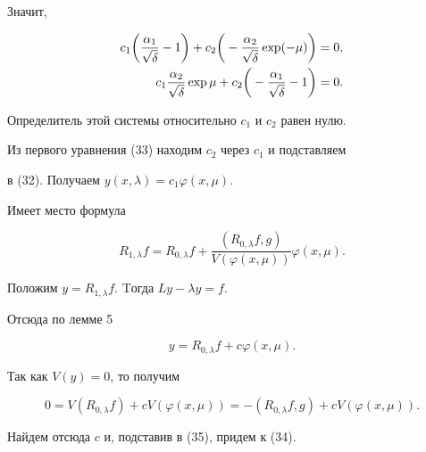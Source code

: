 \begin{pf}
Значит,


\begin{equation}


\begin{split}


c_1\bigg(\frac{\di\alpha_1}{\di\sqrt\delta}-1\bigg)+


c_2\bigg(-\frac{\di\alpha_2}{\di\sqrt\delta}\exp(-\mu)\bigg)&=0,\\


c_1\frac{\di\alpha_2}{\di\sqrt\delta}\exp\mu+


c_2\bigg(-\frac{\di\alpha_1}{\di\sqrt\delta}-1\bigg)&=0.


\end{split}


\end{equation}


Определитель этой системы относительно $c_1$ и $c_2$ равен нулю.


Из первого уравнения (33) находим $c_2$ через $c_1$ и подставляем


в (32). Получаем $y(x,\lambda)=c_1\varphi(x,\mu)$.


\end{pf}





\begin{lem}


Имеет место формула


\begin{equation}


R_{1,\lambda}f=R_{0,\lambda}f+\frac{(R_{0,\lambda}f,g)}


{V(\varphi(x,\mu))}\varphi(x,\mu).


\end{equation}


\end{lem}





\begin{pf}


Положим $y=R_{1,\lambda}f$. Tогда $Ly-\lambda y=f$.


Отсюда по лемме 5


\begin{equation}


y=R_{0,\lambda}f+c\varphi(x,\mu).


\end{equation}


Так как $V(y)=0$, то получим


$$


0=V(R_{0,\lambda}f)+cV(\varphi(x,\mu))=-(R_{0,\lambda}f,g)+


cV(\varphi(x,\mu)).


$$


Найдем отсюда $c$ и, подставив в (35), придем к (34).


\end{pf}


